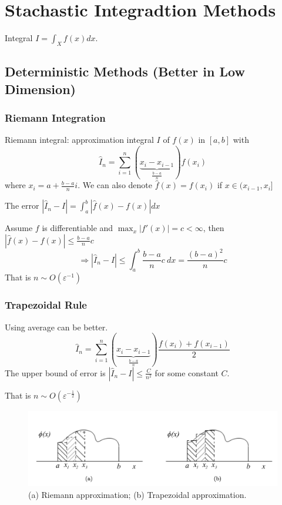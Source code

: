 \documentclass[11pt,a4paper]{article}
\begin{document}
\section{Stachastic Integradtion Methods}
Integral $I=\int_Xf(x)dx$.

\subsection{Deterministic Methods (Better in Low Dimension)}
\subsubsection{Riemann Integration}
Riemann integral: approximation integral $I$ of $f(x)$ in $[a,b]$ with $$\hat{I}_n=\sum_{i=1}^n(\underbrace{x_i-x_{i-1}}_{\frac{b-a}{n}})f(x_i)$$
where $x_i=a+\frac{b-a}{n}i$. We can also denote $\hat{f}(x)=f(x_i)$ if $x\in (x_{i-1},x_i]$

The error $|\hat{I}_n-I|=\int_a^b|\hat{f}(x)-f(x)|dx$

Assume $f$ is differentiable and $\max_x|f'(x)|=c<\infty$, then $|\hat{f}(x)-f(x)|\leq \frac{b-a}{n}c$
$$\Rightarrow |\hat{I}_n-I|\leq \int_a^b\frac{b-a}{n}c\ dx=\frac{(b-a)^2}{n}c$$
That is $n\sim O\left(\varepsilon^{-1}\right)$

\subsubsection{Trapezoidal Rule}
Using average can be better. $$\hat{I}_n=\sum_{i=1}^n(\underbrace{x_i-x_{i-1}}_{\frac{b-a}{n}})\frac{f(x_i)+f(x_{i-1})}{2}$$
The upper bound of error is $|\hat{I}_n-I|\leq \frac{C}{n^2}$ for some constant $C$.

That is $n\sim O\left(\varepsilon^{-\frac{1}{2}}\right)$

\begin{center}\begin{figure}[htbp]
    \centering
    \includegraphics[scale=0.2]{Riemann and Trapezoidal.png}
    \caption{(a) Riemann approximation; (b) Trapezoidal approximation.}
    \label{}
\end{figure}\end{center}
\end{document}
